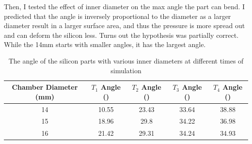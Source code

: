 \documentclass[twoside, 11pt]{article}
\begin{document}
Then, I tested the effect of inner diameter on the max angle the part can bend. I predicted that the angle is inversely proportional to the diameter as a larger diameter result in a larger surface area, and thus the pressure is more spread out and can deform the silicon less. Turns out the hypothesis was partially correct. While the 14mm starts with smaller angles, it has the largest angle.

\begin{table} [H]
	\centering
	\begin{tabular}{|c|c|c|c|c|}
	\hline
	Chamber Diameter (mm) & $T_{1}$ Angle (\degree) & $T_{2}$ Angle (\degree) & $T_{3}$ Angle (\degree) & $T_{4}$ Angle (\degree)\\
	\hline
	14 & 10.55 & 23.43 & 33.64 & 38.88\\
	\hline
	15 & 	18.96 & 	29.8 & 	34.22	 & 36.98\\
	\hline
	16	 & 21.42	 & 29.31	 & 34.24	 & 34.93\\
	\hline
	\end{tabular}
	\caption{The angle of the silicon parts with various inner diameters at different times of simulation}
\end{table}
\end{document}
